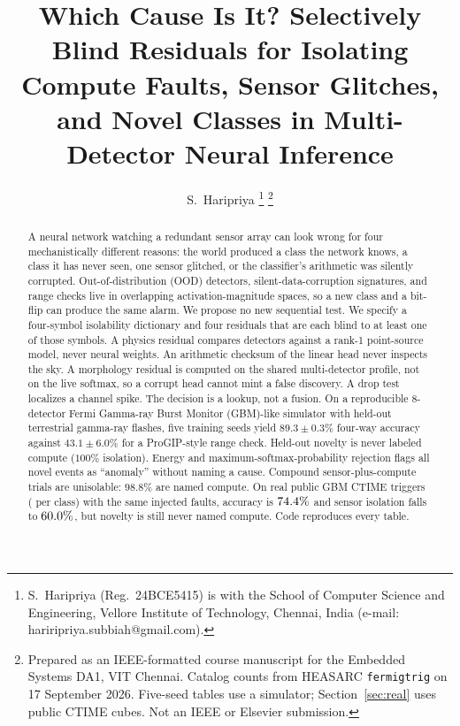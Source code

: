 \documentclass[journal]{IEEEtran}
\begin{document}
\title{Which Cause Is It? Selectively Blind Residuals for Isolating Compute Faults, Sensor Glitches, and Novel Classes in Multi-Detector Neural Inference}

\author{S.~Haripriya
\thanks{S.~Haripriya (Reg.\ 24BCE5415) is with the School of Computer Science and Engineering, Vellore Institute of Technology, Chennai, India (e-mail: hariripriya.subbiah@gmail.com).}
\thanks{Prepared as an IEEE-formatted course manuscript for the Embedded Systems DA1, VIT Chennai. Catalog counts from HEASARC \texttt{fermigtrig} on 17 September 2026. Five-seed tables use a simulator; Section~\ref{sec:real} uses \RealCubes{} public CTIME cubes. Not an IEEE or Elsevier submission.}}


\maketitle

\begin{abstract}
A neural network watching a redundant sensor array can look wrong for four mechanistically different reasons: the world produced a class the network knows, a class it has never seen, one sensor glitched, or the classifier's arithmetic was silently corrupted. Out-of-distribution (OOD) detectors, silent-data-corruption signatures, and range checks live in overlapping activation-magnitude spaces, so a new class and a bit-flip can produce the same alarm. We propose no new sequential test. We specify a four-symbol isolability dictionary and four residuals that are each blind to at least one of those symbols. A physics residual compares detectors against a rank-1 point-source model, never neural weights. An arithmetic checksum of the linear head never inspects the sky. A morphology residual is computed on the shared multi-detector profile, not on the live softmax, so a corrupt head cannot mint a false discovery. A drop test localizes a channel spike. The decision is a lookup, not a fusion. On a reproducible 8-detector Fermi Gamma-ray Burst Monitor (GBM)-like simulator with held-out terrestrial gamma-ray flashes, five training seeds yield $89.3\pm0.3\%$ four-way accuracy against $43.1\pm6.0\%$ for a ProGIP-style range check. Held-out novelty is never labeled compute ($100\%$ isolation). Energy and maximum-softmax-probability rejection flags all novel events as ``anomaly'' without naming a cause. Compound sensor-plus-compute trials are unisolable: $98.8\%$ are named compute. On \RealCubes{} real public GBM CTIME triggers (\RealPerClass{} per class) with the same injected faults, accuracy is $74.4\%$ and sensor isolation falls to $60.0\%$, but novelty is still never named compute. Code reproduces every table.
\end{abstract}
\end{document}
